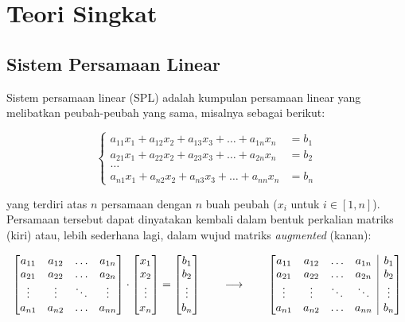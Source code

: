 \section{Teori Singkat}
\subsection{Sistem Persamaan Linear}
Sistem persamaan linear (SPL) adalah kumpulan persamaan linear yang melibatkan peubah-peubah yang sama, misalnya sebagai berikut:

\[\begin{cases}
    a_{11}x_{1} + a_{12}x_{2} + a_{13}x_{3} + \ldots + a_{1n}x_{n} &= b_1 \\ 
    a_{21}x_{1} + a_{22}x_{2} + a_{23}x_{3} + \ldots + a_{2n}x_{n} &= b_2 \\
    \ldots \\
    a_{n1}x_{1} + a_{n2}x_{2} + a_{n3}x_{3} + \ldots + a_{nn}x_{n} &= b_n
\end{cases}\]

yang terdiri atas $n$ persamaan dengan $n$ buah peubah ($x_{i}$ untuk $i \in [1, n]$). Persamaan tersebut dapat dinyatakan kembali dalam bentuk perkalian matriks (kiri) atau, lebih sederhana lagi, dalam wujud matriks \textit{augmented} (kanan):

\begin{equation*}    
    \begin{bmatrix}
        a_{11} & a_{12} & \ldots & a_{1n} \\
        a_{21} & a_{22} & \ldots & a_{2n} \\
        \vdots & \vdots & \ddots & \vdots \\
        a_{n1} & a_{n2} & \ldots & a_{nn} 
    \end{bmatrix} \cdot 
    \begin{bmatrix}
        x_1\\
        x_2\\
        \vdots\\
        x_n
    \end{bmatrix}
    =
    \begin{bmatrix}
        b_1\\
        b_2\\
        \vdots\\
        b_n
    \end{bmatrix}
    \qquad \longrightarrow \qquad
    \left[\begin{array}{@{}cccc|c@{}}
        a_{11} & a_{12} & \ldots & a_{1n} & b_1    \\
        a_{21} & a_{22} & \ldots & a_{2n} & b_2    \\
        \vdots & \vdots & \ddots & \ddots & \vdots \\
        a_{n1} & a_{n2} & \ldots & a_{nn} & b_n 
    \end{array}\right]
\end{equation*}

